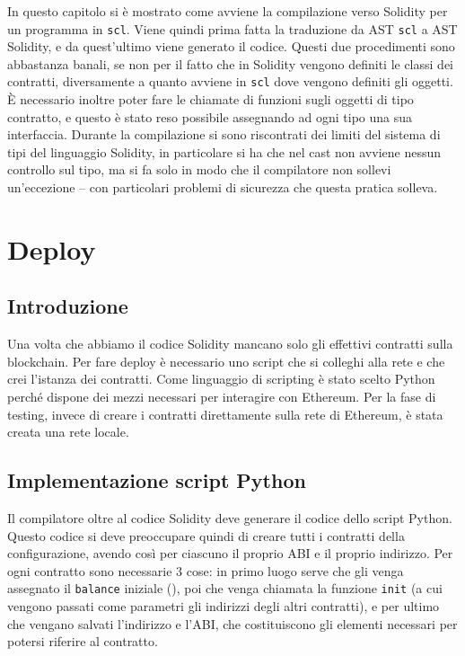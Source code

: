 \documentclass[12pt,a4paper]{report}
\begin{document}
In questo capitolo si è mostrato come avviene la compilazione verso
Solidity per un programma in \texttt{scl}. Viene quindi prima fatta la
traduzione da AST \texttt{scl} a AST Solidity, e da quest'ultimo viene
generato il codice. Questi due procedimenti sono abbastanza banali, se
non per il fatto che in Solidity vengono definiti le classi dei
contratti, diversamente a quanto avviene in \texttt{scl} dove vengono
definiti gli oggetti. È necessario inoltre poter fare le chiamate di
funzioni sugli oggetti di tipo contratto, e questo è stato reso
possibile assegnando ad ogni tipo una sua interfaccia. Durante la
compilazione si sono riscontrati dei limiti del sistema di tipi del
linguaggio Solidity, in particolare si ha che nel cast non avviene
nessun controllo sul tipo, ma si fa solo in modo che il compilatore non
sollevi un'eccezione -- con particolari problemi di sicurezza che questa
pratica solleva.

\hypertarget{deploy}{%
\chapter{Deploy}\label{deploy}}

\hypertarget{introduzione-5}{%
\section{Introduzione}\label{introduzione-5}}

Una volta che abbiamo il codice Solidity mancano solo gli effettivi
contratti sulla blockchain. Per fare deploy è necessario uno script che
si colleghi alla rete e che crei l'istanza dei contratti. Come
linguaggio di scripting è stato scelto Python perché dispone dei mezzi
necessari per interagire con Ethereum. Per la fase di testing, invece di
creare i contratti direttamente sulla rete di Ethereum, è stata creata
una rete locale.

\hypertarget{implementazione-script-python}{%
\section{Implementazione script
Python}\label{implementazione-script-python}}

Il compilatore oltre al codice Solidity deve generare il codice dello
script Python. Questo codice si deve preoccupare quindi di creare tutti
i contratti della configurazione, avendo così per ciascuno il proprio
ABI e il proprio indirizzo. Per ogni contratto sono necessarie 3 cose:
in primo luogo serve che gli venga assegnato il \texttt{balance}
iniziale (), poi che venga chiamata la funzione \texttt{init} (a cui
vengono passati come parametri gli indirizzi degli altri contratti), e
per ultimo che vengano salvati l'indirizzo e l'ABI, che costituiscono
gli elementi necessari per potersi riferire al contratto.
\end{document}
